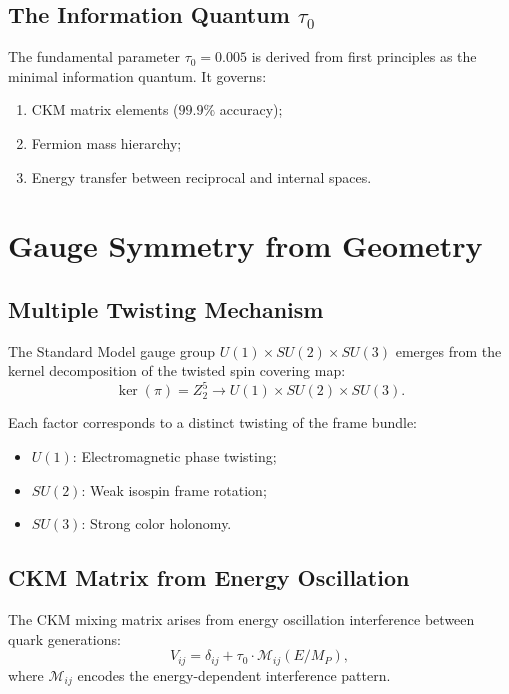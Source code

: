 \documentclass[aps,prd,reprint,superscriptaddress,amsmath,amssymb]{revtex4-2}
\begin{document}
\subsection{The Information Quantum $\tau_0$}

The fundamental parameter $\tau_0 = 0.005$ is derived from first principles as the minimal information quantum. It governs:
\begin{enumerate}
    \item CKM matrix elements ($99.9\%$ accuracy);
    \item Fermion mass hierarchy;
    \item Energy transfer between reciprocal and internal spaces.
\end{enumerate}

\section{Gauge Symmetry from Geometry}
\label{sec:gauge}

\subsection{Multiple Twisting Mechanism}

The Standard Model gauge group $U(1) \times SU(2) \times SU(3)$ emerges from the kernel decomposition of the twisted spin covering map:
\begin{equation}
    \ker(\pi) = Z_2^5 \rightarrow U(1) \times SU(2) \times SU(3).
\end{equation}

Each factor corresponds to a distinct twisting of the frame bundle:
\begin{itemize}
    \item $U(1)$: Electromagnetic phase twisting;
    \item $SU(2)$: Weak isospin frame rotation;
    \item $SU(3)$: Strong color holonomy.
\end{itemize}

\subsection{CKM Matrix from Energy Oscillation}

The CKM mixing matrix arises from energy oscillation interference between quark generations:
\begin{equation}
    V_{ij} = \delta_{ij} + \tau_0 \cdot \mathcal{M}_{ij}(E/M_P),
\end{equation}
where $\mathcal{M}_{ij}$ encodes the energy-dependent interference pattern.
\end{document}
